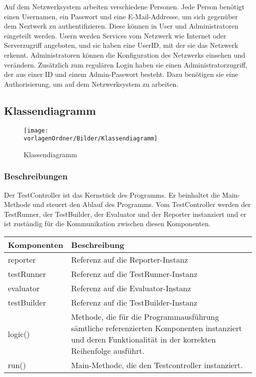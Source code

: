 \documentclass[]{subfiles}
\begin{document}
	Auf dem Netzwerksystem arbeiten verschiedene Personen. 
	Jede Person benötigt einen Usernamen, ein Passwort und eine E-Mail-Addresse, um sich gegenüber dem Neztwerk zu authentifizieren.
	Diese können in User und Administratoren eingeteilt werden. 
	Usern werden Services vom Netzwerk wie Internet oder Serverzugriff angeboten, und sie haben eine UserID, mit der sie das Netzwerk erkennt.
	Administratoren können die Konfiguration des Netzwerks einsehen und verändern. 
	Zusätzlich zum regulären Login haben sie einen Administratorzugriff, der aus einer ID und einem Admin-Passwort besteht.
	Dazu benötigen sie eine Authorisierung, um auf dem Netzwerksystem zu arbeiten.

\begin{landscape}
	\subsection{Klassendiagramm}
	\begin{figure}[h!]
			\texttt{[image: \\vorlagenOrdner/Bilder/Klassendiagramm]}
			\caption{Klassendiagramm}
	\end{figure}
	\newpage	
\end{landscape}


	\subsubsection{Beschreibungen}

	Der TestController ist das Kernstück des Programms. 
	Er beinhaltet die Main-Methode und steuert den Ablauf des Programms. 
	Vom TestController werden der TestRunner, der TestBuilder, der Evaluator 
	und der Reporter instanziert und er ist zuständig für die Kommunikation 
	zwischen diesen Komponenten.
	
	\begin{tabularx}{\textwidth}{lX}
		\toprule
			Komponenten & Beschreibung \\
		\midrule
			reporter & Referenz auf die Reporter-Instanz \\
			testRunner & Referenz auf die TestRunner-Instanz \\
			evaluator & Referenz auf die Evaluator-Instanz \\
			testBuilder & Referenz auf die TestBuilder-Instanz \\
		\midrule
			logic() & Methode, die für die Programmausführung sämtliche referenzierten Komponenten instanziert und deren Funktionalität in der korrekten Reihenfolge ausführt.\\
			run() & Main-Methode, die den Testcontroller instanziert. \\
		\bottomrule
	\end{tabularx}
\end{document}
